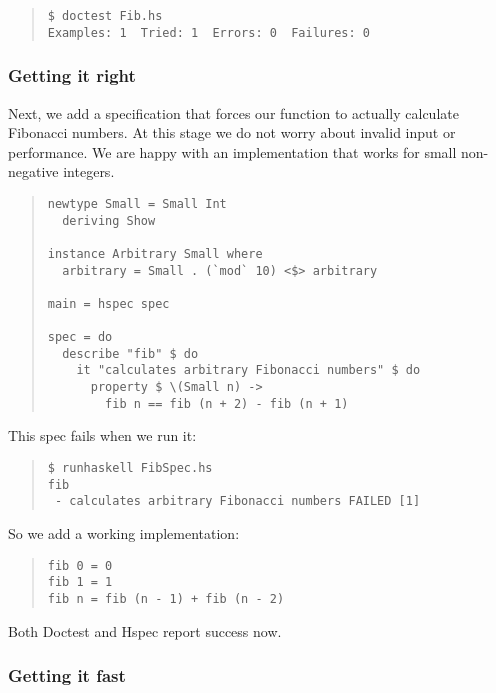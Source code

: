 \documentclass[preprint]{sigplanconf}
\begin{document}
\begin{quote}
\small
\begin{verbatim}
$ doctest Fib.hs
Examples: 1  Tried: 1  Errors: 0  Failures: 0
\end{verbatim}
\end{quote}


\subsubsection{Getting it right}

Next, we add a specification that forces our function to actually
calculate Fibonacci numbers.
At this stage we do not worry about invalid input or performance.  We
are happy with an implementation that works for small non-negative
integers.

\begin{quote}
\small
\begin{verbatim}
newtype Small = Small Int
  deriving Show

instance Arbitrary Small where
  arbitrary = Small . (`mod` 10) <$> arbitrary

main = hspec spec

spec = do
  describe "fib" $ do
    it "calculates arbitrary Fibonacci numbers" $ do
      property $ \(Small n) ->
        fib n == fib (n + 2) - fib (n + 1)
\end{verbatim}
\end{quote}

\noindent This spec fails when we run it:

\begin{quote}
\small
\begin{verbatim}
$ runhaskell FibSpec.hs
fib
 - calculates arbitrary Fibonacci numbers FAILED [1]
\end{verbatim}
\end{quote}

\noindent So we add a working implementation:

\begin{quote}
\small
\begin{verbatim}
fib 0 = 0
fib 1 = 1
fib n = fib (n - 1) + fib (n - 2)
\end{verbatim}
\end{quote}

\noindent Both Doctest and Hspec report success now.


\subsubsection{Getting it fast}
\end{document}
